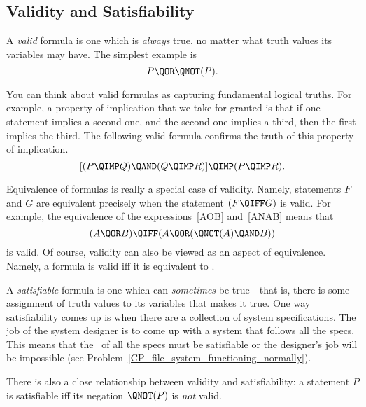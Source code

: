 \subsection{Validity and Satisfiability}
A \emph{valid}  
formula is one which is \emph{always} true, no matter
what truth values its variables may have.  The simplest example is
\[
P \QOR \QNOT(P).
\]

You can think about valid formulas as capturing fundamental logical
truths.  For example, a property of implication that we take for
granted is that if one statement implies a second one, and the second
one implies a third, then the first implies the third.  The following
valid formula confirms the truth of this property of implication.
\[
[(P \QIMP Q) \QAND (Q \QIMP R)] \QIMP (P \QIMP R).
\]

Equivalence of formulas is really a special case of validity.  Namely,
statements $F$ and $G$ are equivalent precisely when the statement $(F
\QIFF G)$ is valid.  For example, the equivalence of the
expressions~\eqref{AOB} and~\eqref{ANAB} means that
\[
(A \QOR B) \QIFF (A \QOR (\QNOT(A) \QAND B))
\]
is valid.  Of course, validity can also be viewed as an aspect of
equivalence.  Namely, a formula is valid iff it is equivalent
to \true.

A \emph{satisfiable}
formula is one which can \emph{sometimes} be
true---that is, there is some assignment of truth values to its
variables that makes it true.  One way satisfiability comes up is when
there are a collection of system specifications.  The job of the
system designer is to come up with a system that follows all the
specs.  This means that the \QAND\ of all the specs must be
satisfiable or the designer's job will be impossible (see
Problem~\ref{CP_file_system_functioning_normally}).

There is also a close relationship between validity and
satisfiability: a statement $P$ is satisfiable iff its
negation $\QNOT(P)$ is \emph{not} valid.

\begin{problems}
\practiceproblems
{}

\examproblems
{}

\classproblems
{}
\end{problems}


